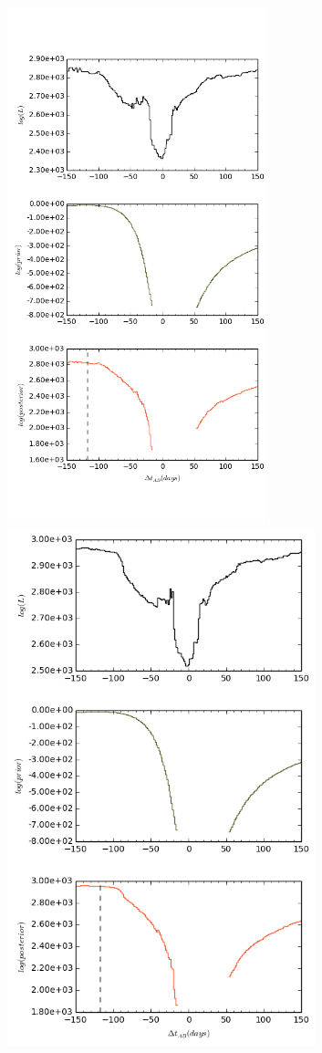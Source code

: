 \documentclass[\docopts]{\docclass}
\begin{document}
\begin{figure}[!h]
  \centering
  \begin{minipage}[bottom]{0.4\textwidth}
\includegraphics[width=\textwidth, height=15cm, keepaspectratio]{whiten1/data9_full_log.png}
  \end{minipage}
  \hfill
  \begin{minipage}[bottom]{0.4\textwidth}
\includegraphics[width=\textwidth, height=15cm, keepaspectratio]{whiten2/data9_full_log.png}

\end{minipage}
\end{figure}
\end{document}
